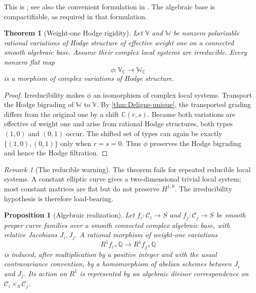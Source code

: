 \documentclass[11pt]{article}
\numberwithin{equation}{section}
\newtheorem{theorem}{Theorem}[section]
\newtheorem{proposition}[proposition]{Proposition}
\theoremstyle{definition}
\theoremstyle{remark}
\newtheorem{remark}[remark]{Remark}
\newcommand{\C}{\mathbb C}
\newcommand{\Q}{\mathbb Q}
\begin{document}
This is \cite[Proposition~1.13]{DeligneFinitude}; see also the convenient
formulation in \cite[Theorem~3(1), linked author manuscript]{BakkerMatsushita}.
The algebraic base is compactifiable, as required in that formulation.

\begin{theorem}[Weight-one Hodge rigidity]\label{thm:Hodge-rigidity}
Let $\mathbb V$ and $\mathbb W$ be nonzero polarizable rational variations of
Hodge structure of effective weight one on a connected smooth algebraic base.
Assume their complex local systems are irreducible.  Every nonzero flat map
\[
  \phi:\mathbb V_{\C}\longrightarrow\mathbb W_{\C}
\]
is a morphism of complex variations of Hodge structure.
\end{theorem}

\begin{proof}
Irreducibility makes $\phi$ an isomorphism of complex local systems.  Transport
the Hodge bigrading of $\mathbb W$ to $\mathbb V$.  By
\cref{thm:Deligne-unique}, the transported grading differs from the original
one by a shift $\C(r,s)$.  Because both variations are effective of weight
one and arise from rational Hodge structures, both types $(1,0)$ and $(0,1)$
occur.  The shifted set of types can again be exactly
$\{(1,0),(0,1)\}$ only when $r=s=0$.  Thus $\phi$ preserves the Hodge
bigrading and hence the Hodge filtration.
\end{proof}

\begin{remark}[The reducible warning]\label{rem:reducible-Hodge}
The theorem fails for repeated reducible local systems.  A constant elliptic
curve gives a two-dimensional trivial local system; most constant matrices are
flat but do not preserve $H^{1,0}$.  The irreducibility hypothesis is therefore
load-bearing.
\end{remark}

\begin{proposition}[Algebraic realization]\label{prop:Jac-correspondence}
Let $f_i:\mathcal C_i\to S$ and $f_j:\mathcal C_j\to S$ be smooth proper
curve families over a smooth connected complex algebraic base, with relative
Jacobians $J_i,J_j$.  A rational morphism of weight-one variations
\[
  R^1f_{i*}\Q\longrightarrow R^1f_{j*}\Q
\]
is induced, after multiplication by a positive integer and with the usual
contravariance convention, by a homomorphism of abelian schemes between
$J_i$ and $J_j$.  Its action on $R^1$ is represented by an algebraic divisor
correspondence on $\mathcal C_i\times_S\mathcal C_j$.
\end{proposition}
\end{document}
